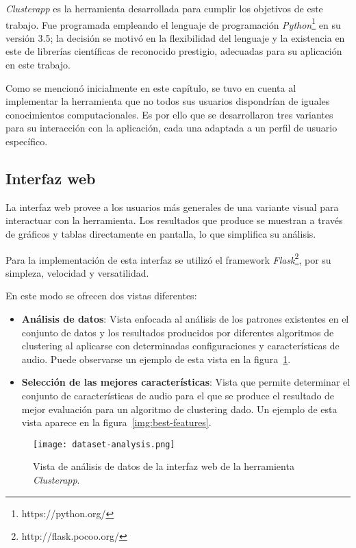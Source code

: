 \textit{Clusterapp} es la herramienta desarrollada para cumplir los objetivos de este trabajo.
Fue programada empleando el lenguaje de programación \textit{Python}\footnote{https://python.org/} en su versión 3.5;
la decisión se motivó en la flexibilidad del lenguaje y la existencia en este de librerías científicas de reconocido prestigio, adecuadas para su aplicación en este trabajo.

Como se mencionó inicialmente en este capítulo, se tuvo en cuenta al implementar la herramienta que no todos sus usuarios dispondrían de iguales conocimientos computacionales.
Es por ello que se desarrollaron tres variantes para su interacción con la aplicación, cada una adaptada a un perfil de usuario específico.

\subsection{Interfaz web}\label{subsec:interfazWeb}

La interfaz web provee a los usuarios más generales de una variante visual para interactuar con la herramienta.
Los resultados que produce se muestran a través de gráficos y tablas directamente en pantalla, lo que simplifica su análisis.

Para la implementación de esta interfaz se utilizó el framework \textit{Flask}\footnote{http://flask.pocoo.org/}, por su simpleza, velocidad y versatilidad.

En este modo se ofrecen dos vistas diferentes:

\begin{itemize}
    \item \textbf{Análisis de datos}: Vista enfocada al análisis de los patrones existentes en el conjunto de datos y los resultados producidos por diferentes algoritmos de clustering al aplicarse con determinadas configuraciones y características de audio. Puede observarse un ejemplo de esta vista en la figura~\ref{img:dataset-analysis}.
    \item \textbf{Selección de las mejores características}: Vista que permite determinar el conjunto de características de audio para el que se produce el resultado de mejor evaluación para un algoritmo de clustering dado. Un ejemplo de esta vista aparece en la figura~\ref{img:best-features}.
\end{itemize}

\begin{figure}[!h]
    \centering
    \texttt{[image: dataset-analysis.png]}
    \caption{Vista de análisis de datos de la interfaz web de la herramienta \textit{Clusterapp}.}
    \label{img:dataset-analysis}
\end{figure}

